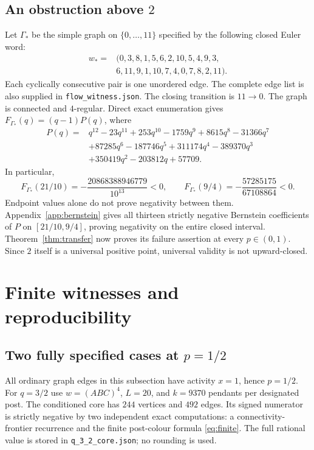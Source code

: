 \documentclass[11pt,a4paper]{article}
\theoremstyle{remark}\newtheorem{remark}[theorem]{Remark}
\begin{document}
\subsection{An obstruction above $2$}\label{sec:above}
Let $\Gamma_*$ be the simple graph on $\{0,\ldots,11\}$ specified by the following closed Euler word:
\begin{equation}\label{eq:wordstar}
\begin{split}
w_*={}&(0,3,8,1,5,6,2,10,5,4,9,3,\\
       &6,11,9,1,10,7,4,0,7,8,2,11).
\end{split}
\end{equation}
Each cyclically consecutive pair is one unordered edge. The complete edge list is also supplied in \texttt{flow\_witness.json}.
The closing transition is $11\to0$. The graph is connected and $4$-regular. Direct exact enumeration gives $F_{\Gamma_*}(q)=(q-1)P(q)$, where
\begin{equation}\label{eq:poly}
\begin{split}
P(q)={}&q^{12}-23q^{11}+253q^{10}-1759q^9+8615q^8-31366q^7\\
 &+87285q^6-187746q^5+311174q^4-389370q^3\\
 &+350419q^2-203812q+57709.
\end{split}
\end{equation}
In particular,
\begin{equation}\label{eq:negativevalue}
F_{\Gamma_*}(21/10)=-\frac{20868388946779}{10^{13}}<0,
\qquad
F_{\Gamma_*}(9/4)=-\frac{57285175}{67108864}<0.
\end{equation}
Endpoint values alone do not prove negativity between them. Appendix~\ref{app:bernstein} gives all thirteen strictly negative Bernstein coefficients of $P$ on $[21/10,9/4]$, proving negativity on the entire closed interval. Theorem~\ref{thm:transfer} now proves its failure assertion at every $p\in(0,1)$. Since $2$ itself is a universal positive point, universal validity is not upward-closed.

\section{Finite witnesses and reproducibility}\label{sec:certificates}
\subsection{Two fully specified cases at $p=1/2$}
All ordinary graph edges in this subsection have activity $x=1$, hence $p=1/2$.
For $q=3/2$ use $w=(ABC)^4$, $L=20$, and $k=9370$ pendants per designated post. The conditioned core has $244$ vertices and $492$ edges. Its signed numerator is strictly negative by two independent exact computations: a connectivity-frontier recurrence and the finite post-colour formula \eqref{eq:finite}. The full rational value is stored in \texttt{q\_3\_2\_core.json}; no rounding is used.
\end{document}
